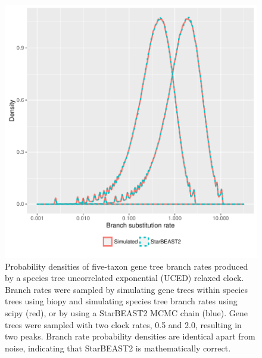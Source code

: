 \documentclass[12pt]{article}
\begin{document}
\begin{figure}[htb!]
\centering
\includegraphics[width=16cm]{exp_gene_branch_rates.pdf}
\caption
{Probability densities of five-taxon gene tree branch rates produced by a
species tree uncorrelated exponential (UCED) relaxed clock. Branch rates were
sampled by simulating gene trees within species trees using biopy and simulating
species tree branch rates using scipy (red), or by using a StarBEAST2 MCMC chain
(blue). Gene trees were sampled with two clock rates, 0.5 and 2.0, resulting in
two peaks. Branch rate probability densities are identical apart from noise,
indicating that StarBEAST2 is mathematically correct.}
\label{fig:geneBranchRatesUCED}
\end{figure}

\clearpage
\end{document}
